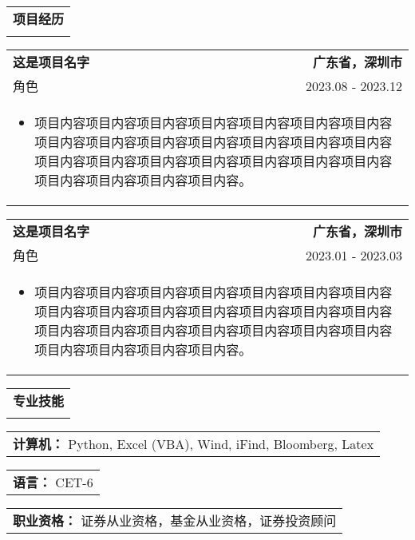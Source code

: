 \documentclass[letterpaper,10pt]{article}
\makeatletter
\newcommand{\thickhline}{\Xhline{2pt}} %
\newcommand{\sectiontitle}[1]{
	\begin{tabular*}{\textwidth}{l}
		{\Large \textbf{#1}} \\
		\thickhline
	\end{tabular*}
	\vspace{-0.8em}
}
\newcommand{\careersection}[5]{
	\begin{tabular*}{\textwidth}{l@{\extracolsep{\fill}}r}
		\textbf{#1} & \textbf{#2} \\
		#3 & #4 \\
		\multicolumn{2}{l}{#5} \\
	\end{tabular*}
}
\newcommand{\technicalsection}[2]{
	\begin{tabular*}{\textwidth}{l}
		\textbf{#1：} #2 \\
	\end{tabular*}
}
\makeatother
\begin{document}
\sectiontitle{项目经历}

\careersection{这是项目名字}{广东省，深圳市}{角色}{2023.08 - 2023.12}{
	\parbox{0.97\textwidth}{
		\begin{itemize}
			\item 项目内容项目内容项目内容项目内容项目内容项目内容项目内容项目内容项目内容项目内容项目内容项目内容项目内容项目内容项目内容项目内容项目内容项目内容项目内容项目内容项目内容项目内容项目内容项目内容项目内容。
		\end{itemize}
	}
}

\careersection{这是项目名字}{广东省，深圳市}{角色}{2023.01 - 2023.03}{
	\parbox{0.97\textwidth}{
		\begin{itemize}
			\item 项目内容项目内容项目内容项目内容项目内容项目内容项目内容项目内容项目内容项目内容项目内容项目内容项目内容项目内容项目内容项目内容项目内容项目内容项目内容项目内容项目内容项目内容项目内容项目内容项目内容。
		\end{itemize}
	}
}


\sectiontitle{专业技能}

\technicalsection{计算机}{Python, Excel (VBA), Wind, iFind, Bloomberg, Latex}
\technicalsection{语言}{CET-6}
\technicalsection{职业资格}{证券从业资格，基金从业资格，证券投资顾问}


\end{document}
